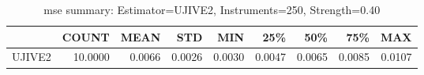 \begin{table}[ht]
\centering
\caption{mse summary: Estimator=UJIVE2, Instruments=250, Strength=0.40}
\begin{tabular}{lrrrrrrrr}
\toprule
 & COUNT & MEAN & STD & MIN & 25\% & 50\% & 75\% & MAX \\
\midrule
UJIVE2 & 10.0000 & 0.0066 & 0.0026 & 0.0030 & 0.0047 & 0.0065 & 0.0085 & 0.0107 \\
\bottomrule
\end{tabular}
\end{table}
